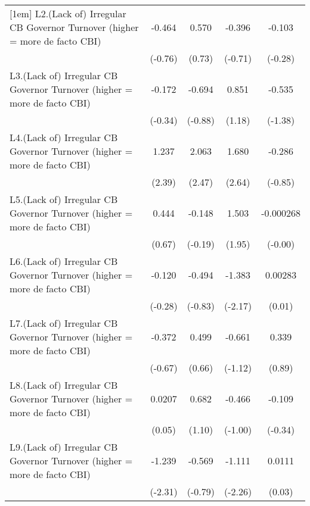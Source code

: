 {\begin{longtable}{l*{4}{c}}
[1em]
L2.(Lack of) Irregular CB Governor Turnover (higher = more de facto CBI)&   -0.464         &    0.570         &   -0.396         &   -0.103         \\
                &  (-0.76)         &   (0.73)         &  (-0.71)         &  (-0.28)         \\
[1em]
L3.(Lack of) Irregular CB Governor Turnover (higher = more de facto CBI)&   -0.172         &   -0.694         &    0.851         &   -0.535         \\
                &  (-0.34)         &  (-0.88)         &   (1.18)         &  (-1.38)         \\
[1em]
L4.(Lack of) Irregular CB Governor Turnover (higher = more de facto CBI)&    1.237\sym{*}  &    2.063\sym{*}  &    1.680\sym{**} &   -0.286         \\
                &   (2.39)         &   (2.47)         &   (2.64)         &  (-0.85)         \\
[1em]
L5.(Lack of) Irregular CB Governor Turnover (higher = more de facto CBI)&    0.444         &   -0.148         &    1.503         &-0.000268         \\
                &   (0.67)         &  (-0.19)         &   (1.95)         &  (-0.00)         \\
[1em]
L6.(Lack of) Irregular CB Governor Turnover (higher = more de facto CBI)&   -0.120         &   -0.494         &   -1.383\sym{*}  &  0.00283         \\
                &  (-0.28)         &  (-0.83)         &  (-2.17)         &   (0.01)         \\
[1em]
L7.(Lack of) Irregular CB Governor Turnover (higher = more de facto CBI)&   -0.372         &    0.499         &   -0.661         &    0.339         \\
                &  (-0.67)         &   (0.66)         &  (-1.12)         &   (0.89)         \\
[1em]
L8.(Lack of) Irregular CB Governor Turnover (higher = more de facto CBI)&   0.0207         &    0.682         &   -0.466         &   -0.109         \\
                &   (0.05)         &   (1.10)         &  (-1.00)         &  (-0.34)         \\
[1em]
L9.(Lack of) Irregular CB Governor Turnover (higher = more de facto CBI)&   -1.239\sym{*}  &   -0.569         &   -1.111\sym{*}  &   0.0111         \\
                &  (-2.31)         &  (-0.79)         &  (-2.26)         &   (0.03)         \\

\end{longtable}}

